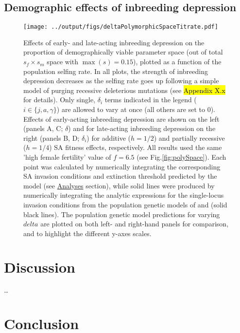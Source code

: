 \documentclass[11pt]{article}
\begin{document}
\subsection*{Demographic effects of inbreeding depression} \label{sec:Res:InbreedEffects}

 \begin{figure}[htbp]
 \centering
 \texttt{[image: ../output/figs/deltaPolymorphicSpaceTitrate.pdf]}
 \caption{\footnotesize{Effects of early- and late-acting inbreeding depression on the proportion of demographically viable parameter space (out of total $s_f \times s_m$ space with $\max(s) = 0.15$), plotted as a function of the population selfing rate. In all plots, the strength of inbreeding depression decreases as the selfing rate goes up following a simple model of purging recessive deleterious mutations (see \hl{Appendix X.x} for details). Only single, $\delta_i$ terms indicated in the legend ($i \in \{j,a,\gamma\}$) are allowed to vary at once (all others are set to $0$). Effects of early-acting inbreeding depression are shown on the left (panels A, C; $\delta$) and for late-acting inbreeding depression on the right (panels B, D; $\delta_i$) for additive ($h = 1/2$) and partially recessive ($h = 1/4$) SA fitness effects, respectively. All results used the same 'high female fertility' value of $f = 6.5$ (see Fig.\ref{fig:polySpace}). Each point was calculated by numerically integrating the corresponding SA invasion conditions and extinction threshold predicted by the model (see \hyperref[sec:analyses]{Analyses} section), while solid lines were produced by numerically integrating the analytic expressions for the single-locus invasion conditions from the population genetic models of \citet{JordanConnallon2014} and \citet{Olito2017} (solid black lines). The population genetic model predictions for varying $delta$ are plotted on both left- and right-hand panels for comparison, and to highlight the different y-axes scales.}} 
 \label{fig:deltaPolySpace}
 \end{figure}



\section*{Discussion}

\ldots

\section*{Conclusion}
\end{document}
